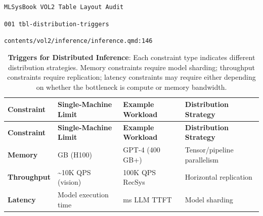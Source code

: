 \documentclass[
  twoside]{scrbook}
\author{}
\date{}
\makeatletter
\let\originalfrontmatter\frontmatter
\renewcommand{\frontmatter}{%
  \clearpage%
  \originalfrontmatter%
}
\let\originalmainmatter\mainmatter
\renewcommand{\mainmatter}{%
  \clearpage%
  \originalmainmatter%
}
\newif\ifmlsys@inside@longtable
\newif\ifmlsys@longtable@numbered
\let\mlsys@orig@label\label
\renewcommand{\label}[1]{%
  \ifmlsys@inside@longtable
    \global\mlsys@longtable@numberedtrue
  \fi
  \mlsys@orig@label{#1}%
}
\makeatother
\begin{document}
\frontmatter


\mainmatter
\pagestyle{empty}

\texttt{MLSysBook\ VOL2\ Table\ Layout\ Audit}

\texttt{001\ tbl-distribution-triggers}

\texttt{contents/vol2/inference/inference.qmd:146}

\begin{longtable}[]{@{}
  >{\raggedright\arraybackslash}p{}
  >{\centering\arraybackslash}p{}
  >{\centering\arraybackslash}p{}
  >{\centering\arraybackslash}p{}@{}}
\caption{\textbf{Triggers for Distributed Inference}: Each constraint
type indicates different distribution strategies. Memory constraints
require model sharding; throughput constraints require replication;
latency constraints may require either depending on whether the
bottleneck is compute or memory
bandwidth.}\label{tbl-distribution-triggers}\tabularnewline
\toprule\noalign{}
\begin{minipage}[b]{\linewidth}\raggedright
\textbf{Constraint}
\end{minipage} & \begin{minipage}[b]{\linewidth}\centering
\textbf{Single-Machine Limit}
\end{minipage} & \begin{minipage}[b]{\linewidth}\centering
\textbf{Example Workload}
\end{minipage} & \begin{minipage}[b]{\linewidth}\centering
\textbf{Distribution Strategy}
\end{minipage} \\
\midrule\noalign{}
\endfirsthead
\toprule\noalign{}
\begin{minipage}[b]{\linewidth}\raggedright
\textbf{Constraint}
\end{minipage} & \begin{minipage}[b]{\linewidth}\centering
\textbf{Single-Machine Limit}
\end{minipage} & \begin{minipage}[b]{\linewidth}\centering
\textbf{Example Workload}
\end{minipage} & \begin{minipage}[b]{\linewidth}\centering
\textbf{Distribution Strategy}
\end{minipage} \\
\midrule\noalign{}
\endhead
\bottomrule\noalign{}
\endlastfoot
\textbf{Memory} & 80 GB (H100) & GPT-4 (400 GB+) & Tensor/pipeline
parallelism \\
\textbf{Throughput}\index{Distributed Inference!throughput constraint} &
\textasciitilde10K QPS (vision) & 100K QPS RecSys & Horizontal
replication \\
\textbf{Latency}\index{Distributed Inference!latency constraint} & Model
execution time & 500 ms LLM TTFT & Model sharding \\
\end{longtable}
\end{document}

